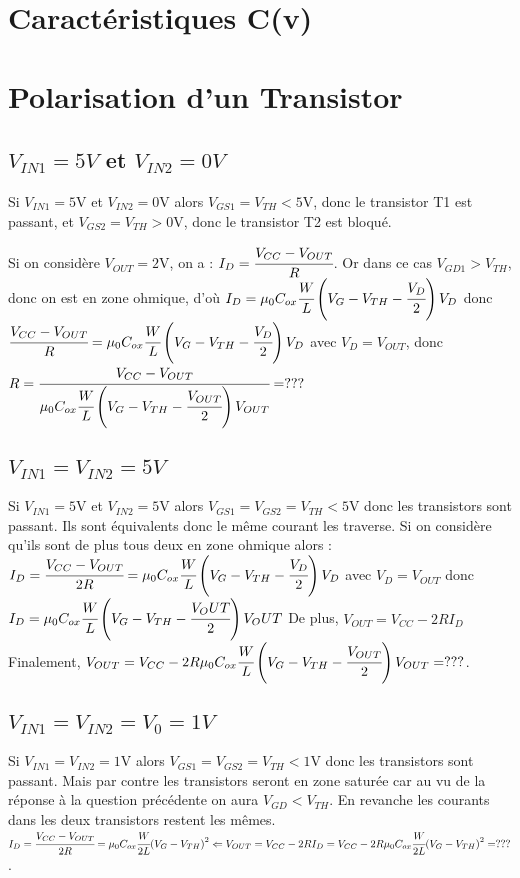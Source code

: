 \documentclass[10pt]{article}
\begin{document}
 
 \section{Caractéristiques C(v)}
 
 
 \section{Polarisation d’un Transistor}
 
 \subsection{$V_{IN1} = 5V$ et $V_{IN2} = 0V$}
 
 Si $V_{IN1} = 5$V et $V_{IN2} = 0$V alors $V_{GS1} = V_{TH} < 5$V, donc le transistor T1 est passant,
 et $V_{GS2} = V_{TH} > 0$V, donc le transistor T2 est bloqué.
 
 Si on considère $V_{OUT} = 2$V, on a : $I_{D} = \cfrac{V_{CC} - V_{OUT}}{R}$.
 Or dans ce cas $V_{GD1} > V_{TH}$, donc on est en zone ohmique, d'où
 $I_D = \mu_0 C_{ox} \cfrac{W}{L} \left(V_G - V_{TH} - \cfrac{V_D}{2}\right)V_D$
 donc $\cfrac{V_{CC} - V_{OUT}}{R} = \mu_0 C_{ox} \cfrac{W}{L} \left(V_G - V_{TH} - \cfrac{V_D}{2}\right)V_D$ avec $V_D = V_{OUT}$,
 donc $R =\cfrac{V_{CC} - V_{OUT}}{\mu_0 C_{ox} \cfrac{W}{L} \left(V_G - V_{TH} - \cfrac{V_{OUT}}{2}\right)V_{OUT}} = ???$
 
 \subsection{$V_{IN1} = V_{IN2} = 5V$}
 
 Si $V_{IN1} = 5$V et $V_{IN2} = 5$V alors $V_{GS1} = V_{GS2} = V_{TH} < 5$V  donc les transistors sont passant. Ils sont équivalents donc le même courant les traverse.
 Si on considère qu'ils sont de plus tous deux en zone ohmique alors :
 $I_{D} = \cfrac{V_{CC} - V_{OUT}}{2 R} = \mu_0 C_{ox} \cfrac{W}{L} \left(V_G - V_{TH} - \cfrac{V_D}{2}\right)V_D$
 avec $V_D = V_{OUT}$ donc
 $I_D = \mu_0 C_{ox} \cfrac{W}{L} \left(V_G - V_{TH} - \cfrac{V_OUT}{2}\right)V_OUT$
 De plus,
 $V_{OUT} = V_{CC} - 2 R I_D$
 Finalement, $V_{OUT} = V_{CC} - 2 R \mu_0 C_{ox} \cfrac{W}{L} \left(V_G - V_{TH} - \cfrac{V_{OUT}}{2}\right)V_{OUT} = ???$. %
 
 \subsection{$V_{IN1} = V_{IN2} = V_0 = 1V$}
 Si $V_{IN1} = V_{IN2} = 1$V alors $V_{GS1} = V_{GS2} = V_{TH} < 1$V donc les transistors sont passant. Mais par contre les transistors seront en zone saturée car au vu de la réponse à la question précédente on aura $V_{GD} < V_{TH}$. En revanche les courants dans les deux transistors restent les mêmes.
 $I_D = \cfrac{V_{CC} - V_{OUT}}{2 R} = \mu_0 C_{ox} \cfrac{W}{2L}{\left(V_G - V_{TH}\right)}^2 \Leftarrow
 V_{OUT} = V_{CC} - 2 R I_D = V_{CC} - 2 R \mu_0 C_{ox} \cfrac{W}{2L}{\left(V_G - V_{TH}\right)}^2 = ???$.
 
\end{document}
